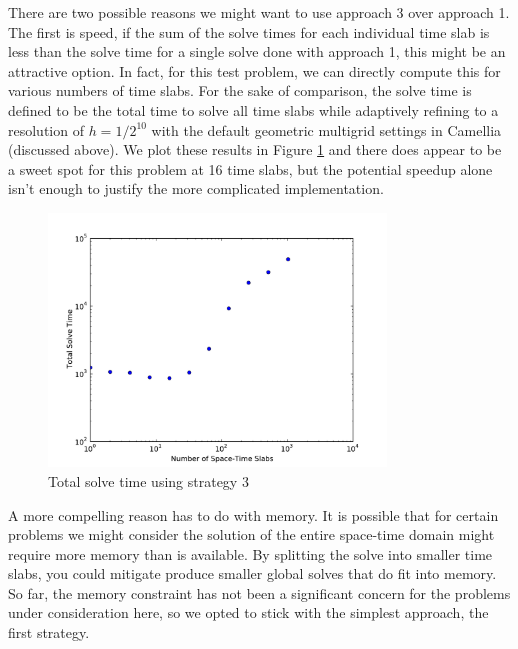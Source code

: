 \documentclass[Dissertation.tex]{subfiles}
\begin{document}
There are two possible reasons we might want to use approach 3 over approach 1.
The first is speed, if the sum of the solve times for each individual time slab is
less than the solve time for a single solve done with approach 1, this might be an
attractive option. In fact, for this test problem, we can directly compute this for
various numbers of time slabs. 
For the sake of comparison, the solve time is defined to be the total time to solve all
time slabs while adaptively refining to a resolution of $h=1/2^{10}$ 
with the default geometric multigrid settings in Camellia (discussed above).
We plot these results in Figure \ref{fig:TimeSlabSolveTime} and there does appear to be 
a sweet spot for this problem at 16 time slabs, but the potential speedup alone isn't 
enough to justify the more complicated implementation.
\begin{figure}
\centering
\includegraphics[width=0.8\textwidth]{Dissertation/Scaling/TimeSlabSolveTime.pdf}
\caption{Total solve time using strategy 3}
\label{fig:TimeSlabSolveTime}
\end{figure}

A more compelling reason has to do with memory. It is possible that for certain problems we might consider
the solution of the entire space-time domain might require more memory than is available.
By splitting the solve into smaller time slabs, you could mitigate produce smaller global solves that do 
fit into memory. So far, the memory constraint has not been a significant concern for the problems under
consideration here, so we opted to stick with the simplest approach, the first strategy.
\end{document}
